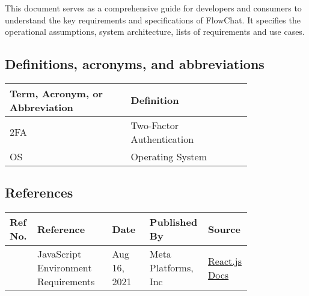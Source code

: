 \documentclass[11pt, a4paper]{article}
\begin{document}
This document serves as a comprehensive guide for developers and consumers to understand the key requirements and specifications of FlowChat. It specifies the operational assumptions, system architecture, lists of requirements and use cases.

\bigskip
\subsection{Definitions, acronyms, and abbreviations}
\begin{center}
\begin{tabular}{|>{\centering\arraybackslash}p{0.4\linewidth}|>{\centering\arraybackslash}p{0.4\linewidth}|} \hline
     Term, Acronym, or Abbreviation&  Definition\\ \hline 
     2FA&  Two-Factor Authentication\\ \hline 
     OS&  Operating System\\ \hline 
\end{tabular}
\end{center}

\bigskip
\subsection{References}
\begin{center}
\begin{tabular}{|>{\centering\arraybackslash}m{0.1\linewidth}|>{\centering\arraybackslash}m{0.3\linewidth}|>{\centering\arraybackslash}m{0.15\linewidth}|>{\centering\arraybackslash}m{0.15\linewidth}|>{\centering\arraybackslash}m{0.1\linewidth}|} \hline
     Ref No.& Reference& Date& Published By& Source\\ \hline 
     1&  JavaScript Environment Requirements&  Aug 16, 2021& Meta Platforms, Inc& \href{https://legacy.reactjs.org/docs/javascript-environment-requirements.html}{React.js Docs}\\\hline 
\end{tabular}
\end{center}

\bigskip\bigskip
\end{document}
